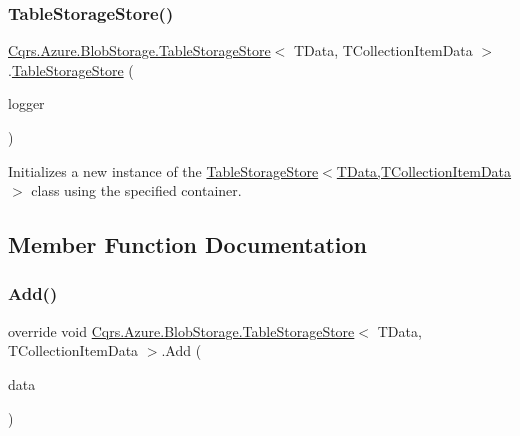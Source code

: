 \subsubsection{\texorpdfstring{Table\+Storage\+Store()}{TableStorageStore()}}
{\footnotesize\ttfamily \hyperlink{classCqrs_1_1Azure_1_1BlobStorage_1_1TableStorageStore}{Cqrs.\+Azure.\+Blob\+Storage.\+Table\+Storage\+Store}$<$ T\+Data, T\+Collection\+Item\+Data $>$.\hyperlink{classCqrs_1_1Azure_1_1BlobStorage_1_1TableStorageStore}{Table\+Storage\+Store} (\begin{DoxyParamCaption}\item[{I\+Logger}]{logger }\end{DoxyParamCaption})\hspace{0.3cm}{\ttfamily [protected]}}



Initializes a new instance of the \hyperlink{classCqrs_1_1Azure_1_1BlobStorage_1_1TableStorageStore_aabc36bc46ffb22b716cc7769a641cfab}{Table\+Storage\+Store$<$\+T\+Data,\+T\+Collection\+Item\+Data$>$} class using the specified container. 



\subsection{Member Function Documentation}
\mbox{\label{classCqrs_1_1Azure_1_1BlobStorage_1_1TableStorageStore_ad9becfb4b149c645450deba342696e54}} 
\subsubsection{\texorpdfstring{Add()}{Add()}\hspace{0.1cm}{\footnotesize\ttfamily [1/6]}}
{\footnotesize\ttfamily override void \hyperlink{classCqrs_1_1Azure_1_1BlobStorage_1_1TableStorageStore}{Cqrs.\+Azure.\+Blob\+Storage.\+Table\+Storage\+Store}$<$ T\+Data, T\+Collection\+Item\+Data $>$.Add (\begin{DoxyParamCaption}\item[{T\+Data}]{data }\end{DoxyParamCaption})\hspace{0.3cm}{\ttfamily [virtual]}}



